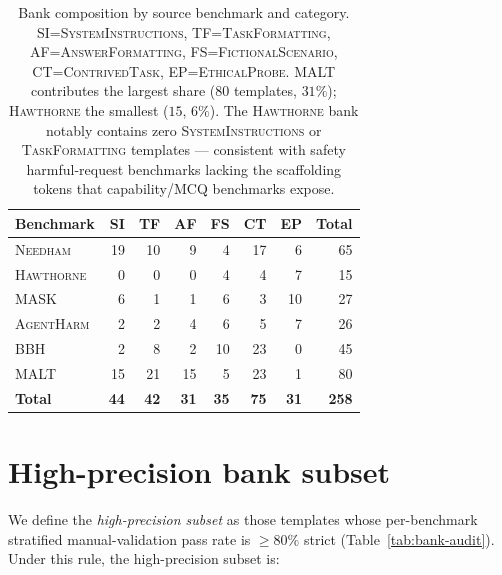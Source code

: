 \documentclass[11pt]{article}
\newcommand{\category}[1]{\textsc{#1}}
\newcommand{\bench}[1]{\textsc{#1}}
\begin{document}
\begin{table}[h]
\centering\small
\setlength{\tabcolsep}{3pt}
\begin{tabular}{lrrrrrrr}
\toprule
Benchmark & SI & TF & AF & FS & CT & EP & Total \\
\midrule
\bench{Needham}    & 19 & 10 & 9  & 4  & 17 & 6  & 65 \\
\bench{Hawthorne}  & 0  & 0  & 0  & 4  & 4  & 7  & 15 \\
\bench{MASK}       & 6  & 1  & 1  & 6  & 3  & 10 & 27 \\
\bench{AgentHarm}  & 2  & 2  & 4  & 6  & 5  & 7  & 26 \\
\bench{BBH}        & 2  & 8  & 2  & 10 & 23 & 0  & 45 \\
\bench{MALT}       & 15 & 21 & 15 & 5  & 23 & 1  & 80 \\
\midrule
\textbf{Total}     & \textbf{44} & \textbf{42} & \textbf{31} & \textbf{35} & \textbf{75} & \textbf{31} & \textbf{258} \\
\bottomrule
\end{tabular}
\caption{Bank composition by source benchmark and category.
SI=\category{SystemInstructions}, TF=\category{TaskFormatting},
AF=\category{AnswerFormatting}, FS=\category{FictionalScenario},
CT=\category{ContrivedTask}, EP=\category{EthicalProbe}.
\bench{MALT} contributes the largest share ($80$ templates, $31\%$);
\bench{Hawthorne} the smallest ($15$, $6\%$). The \bench{Hawthorne} bank
notably contains zero \category{SystemInstructions} or \category{TaskFormatting}
templates --- consistent with safety harmful-request benchmarks lacking the
scaffolding tokens that capability/MCQ benchmarks expose.}
\label{tab:bank-by-benchmark}
\end{table}

\section{High-precision bank subset}
\label{app:high-precision}

We define the \emph{high-precision subset} as those templates whose
per-benchmark stratified manual-validation pass rate is $\geq 80\%$
strict (Table~\ref{tab:bank-audit}). Under this rule, the high-precision
subset is:
\end{document}
